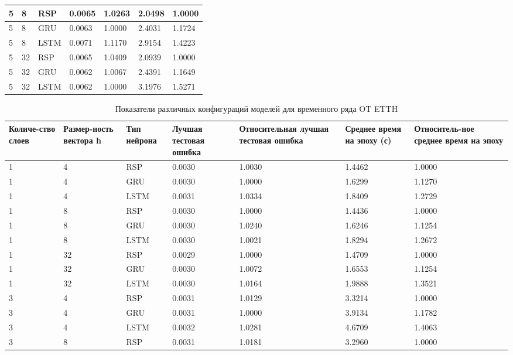 \documentclass[11pt]{article}
\begin{document}
\begin{table}[H]
\begin{tabular}{|p{1.4cm}|p{1.4cm}|p{1.4cm}|p{1.5cm}|p{2.5cm}|p{1.9cm}|p{2cm}|}
\hline
 5 &   8 &   RSP & 0.0065 & 1.0263 & 2.0498 &  1.0000 \\
\hline
 5 &   8 &   GRU & 0.0063 & 1.0000 & 2.4031 &  1.1724 \\
\hline
 5 &   8 &  LSTM & 0.0071 & 1.1170 & 2.9154 &  1.4223 \\
\hline
 5 &  32 &   RSP & 0.0065 & 1.0409 & 2.0939 &  1.0000 \\
\hline
 5 &  32 &   GRU & 0.0062 & 1.0067 & 2.4391 &  1.1649 \\
\hline
 5 &  32 &  LSTM & 0.0062 & 1.0000 & 3.1976 &  1.5271 \\
\hline
\end{tabular}
\end{table}

\begin{table}[H]
\caption{Показатели различных конфигураций моделей для временного ряда OT ETTH}
\begin{tabular}{|p{1.4cm}|p{1.4cm}|p{1.4cm}|p{1.5cm}|p{2.5cm}|p{1.9cm}|p{2cm}|}
\hline
Количе-ство слоев &  Размер-ность вектора h & Тип нейрона & Лучшая тестовая ошибка & Относительная лучшая тестовая ошибка & Среднее время на эпоху (с) & Относитель-ное среднее время на эпоху \\
\hline
1 &   4 &   RSP & 0.0030 & 1.0030 & 1.4462 &  1.0000 \\
\hline
1 &   4 &   GRU & 0.0030 & 1.0000 & 1.6299 &  1.1270 \\
\hline
1 &   4 &  LSTM & 0.0031 & 1.0334 & 1.8409 &  1.2729 \\
\hline
1 &   8 &   RSP & 0.0030 & 1.0000 & 1.4436 &  1.0000 \\
\hline
1 &   8 &   GRU & 0.0030 & 1.0240 & 1.6246 &  1.1254 \\
\hline
1 &   8 &  LSTM & 0.0030 & 1.0021 & 1.8294 &  1.2672 \\
\hline
1 &  32 &   RSP & 0.0029 & 1.0000 & 1.4709 &  1.0000 \\
\hline
1 &  32 &   GRU & 0.0030 & 1.0072 & 1.6553 &  1.1254 \\
\hline
1 &  32 &  LSTM & 0.0030 & 1.0164 & 1.9888 &  1.3521 \\
\hline
3 &   4 &   RSP & 0.0031 & 1.0129 & 3.3214 &  1.0000 \\
\hline
3 &   4 &   GRU & 0.0031 & 1.0000 & 3.9134 &  1.1782 \\
\hline
3 &   4 &  LSTM & 0.0032 & 1.0281 & 4.6709 &  1.4063 \\
\hline
3 &   8 &   RSP & 0.0031 & 1.0181 & 3.2960 &  1.0000 \\

\end{tabular}
\end{table}
\end{document}
